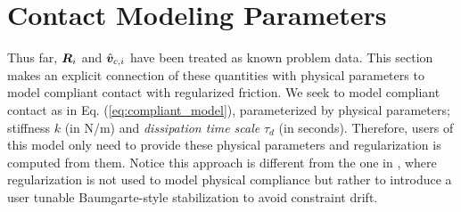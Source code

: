 \section{Contact Modeling Parameters}
\label{sec:contact_modeling_parameters}

Thus far, ${\bm{R}}_i$ and $\hat{{\bm{v}}}_{c,i}$ have been treated as known problem
data. This section makes an explicit connection of these quantities with
physical parameters to model compliant contact with regularized friction. We
seek to model compliant contact as in Eq. (\ref{eq:compliant_model}),
parameterized by physical parameters; stiffness $k$ (in N/m) and
\textit{dissipation time scale} $\tau_d$ (in seconds). Therefore, users of this
model only need to provide these physical parameters and regularization is
computed from them. Notice this approach is different from the one in
\cite{bib:todorov2014}, where regularization is not used to model physical
compliance but rather to introduce a user tunable Baumgarte-style stabilization
to avoid constraint drift. 



